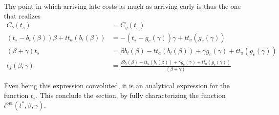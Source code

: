 The point in which arriving late costs as much as arriving early is thus the one that realizes
\begin{equation}
  \label{eq:t_s_numbers}
  \begin{split}
    C_b(t_s) & = C_g(t_s) \\
    (t_s - b_i(\beta))\beta + tt_a(b_i(\beta)) & = -(t_s - g_e(\gamma))\gamma + tt_a(g_e(\gamma)) \\
    (\beta + \gamma)t_s & = \beta b_i(\beta) - tt_a(b_i(\beta)) + \gamma g_e(\gamma) + tt_a(g_e(\gamma)) \\
    t_s(\beta, \gamma) & = \frac{\beta b_i(\beta) - tt_a(b_i(\beta)) + \gamma g_e(\gamma) + tt_a(g_e(\gamma))}{(\beta + \gamma)}
  \end{split}
\end{equation}

Even being this expression convoluted, it is an analytical expression for the function \(t_s\).
This conclude the section, by fully characterizing the function \(t^{opt}(t^*, \beta, \gamma)\).

